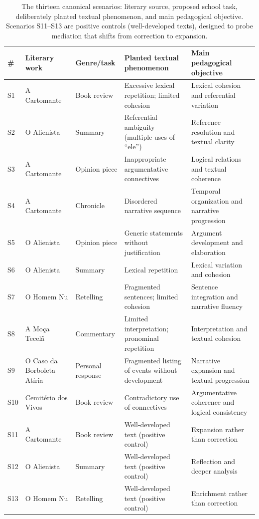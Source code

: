 \documentclass{sbc2023}%
\begin{document}
\begin{table}[!ht]
\caption{The thirteen canonical scenarios: literary source, proposed school task, deliberately planted textual phenomenon, and main pedagogical objective. Scenarios S11--S13 are positive controls (well-developed texts), designed to probe mediation that shifts from correction to expansion.}
\centering
\footnotesize
\begin{tabular}{@{}llp{2.7cm}p{3.5cm}p{3.9cm}@{}}
\hline\hline
\# & Literary work & Genre/task & Planted textual phenomenon & Main pedagogical objective \\
\hline
S1 & A Cartomante & Book review & Excessive lexical repetition; limited cohesion & Lexical cohesion and referential variation \\
S2 & O Alienista & Summary & Referential ambiguity (multiple uses of ``ele'') & Reference resolution and textual clarity \\
S3 & A Cartomante & Opinion piece & Inappropriate argumentative connectives & Logical relations and textual coherence \\
S4 & A Cartomante & Chronicle & Disordered narrative sequence & Temporal organization and narrative progression \\
S5 & O Alienista & Opinion piece & Generic statements without justification & Argument development and elaboration \\
S6 & O Alienista & Summary & Lexical repetition & Lexical variation and cohesion \\
S7 & O Homem Nu & Retelling & Fragmented sentences; limited cohesion & Sentence integration and narrative fluency \\
S8 & A Mo\c{c}a Tecel\~a & Commentary & Limited interpretation; pronominal repetition & Interpretation and textual cohesion \\
S9 & O Caso da Borboleta At\'iria & Personal response & Fragmented listing of events without development & Narrative expansion and textual progression \\
S10 & Cemit\'erio dos Vivos & Book review & Contradictory use of connectives & Argumentative coherence and logical consistency \\
S11 & A Cartomante & Book review & Well-developed text (positive control) & Expansion rather than correction \\
S12 & O Alienista & Summary & Well-developed text (positive control) & Reflection and deeper analysis \\
S13 & O Homem Nu & Retelling & Well-developed text (positive control) & Enrichment rather than correction \\
\hline\hline
\end{tabular}
\label{tab:scenarios}
\end{table}
\end{document}
